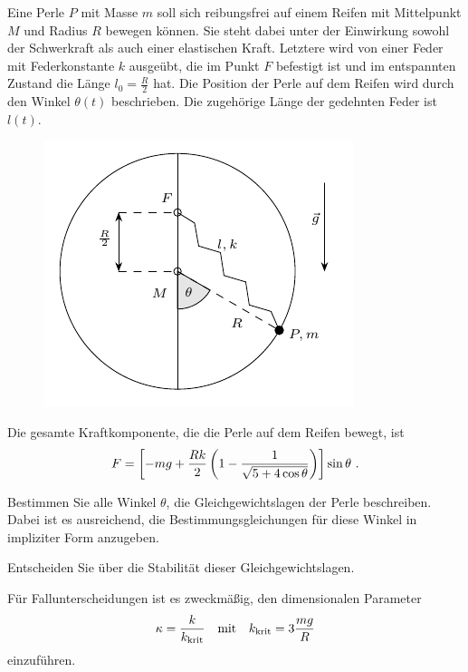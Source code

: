 \begin{atiTask}[
  title = Gleichgewichtspunkte und kleine Schwingungen
]
  Eine Perle $P$ mit Masse $m$ soll sich reibungsfrei auf einem Reifen mit Mittelpunkt $M$ und Radius $R$ bewegen können.
  Sie steht dabei unter der Einwirkung sowohl der Schwerkraft als auch einer elastischen Kraft.
  Letztere wird von einer Feder mit Federkonstante $k$ ausgeübt, die im Punkt $F$ befestigt ist und im entspannten Zustand die Länge $l_0 = \frac{R}{2}$ hat.
  Die Position der Perle auf dem Reifen wird durch den Winkel $\theta(t)$ beschrieben.
  Die zugehörige Länge der gedehnten Feder ist $l(t)$.
  \begin{figure}[H]
    \center
    \includegraphics{task-gleichgewichtspunkte_und_kleine_schwingungen-sketch.pdf}
  \end{figure}
  Die gesamte Kraftkomponente, die die Perle auf dem Reifen bewegt, ist
  \[
    F = \left[ -mg + \frac{Rk}{2}\left( 1 - \frac{1}{\sqrt{5 + 4\cos \theta}} \right) \right]\sin \theta \ .
  \]
  \begin{atiSubtasks}
    \item{
      Bestimmen Sie alle Winkel $\theta$, die Gleichgewichtslagen der Perle beschreiben.
      Dabei ist es ausreichend, die Bestimmungsgleichungen für diese Winkel in impliziter Form anzugeben.
    }
    \item{
      Entscheiden Sie über die Stabilität dieser Gleichgewichtslagen.

      \begin{atiNote}
        Für Fallunterscheidungen ist es zweckmäßig, den dimensionalen Parameter
        \[
          \kappa = \frac{k}{k_{\mathrm{krit}}} \quad \text{mit} \quad k_{\mathrm{krit}} = 3\frac{mg}{R}
        \]
        einzuführen.
      \end{atiNote}
    }
  \end{atiSubtasks}
\end{atiTask}